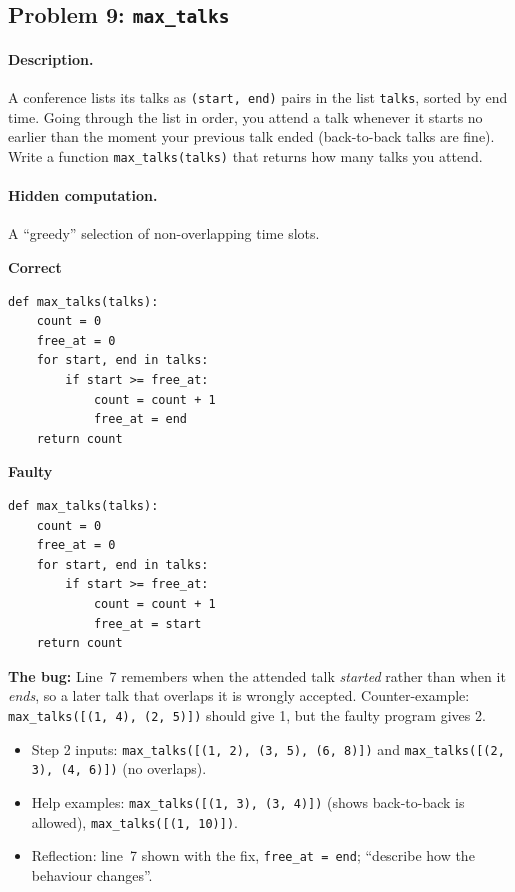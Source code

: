 \documentclass[11pt,a4paper]{article}
\newenvironment{codepair}{\par\noindent}{\par\medskip}
\newcommand{\codelabel}[1]{\textbf{\small #1}\par\vspace{2pt}}
\newcommand{\bugnote}[1]{\par\noindent\textcolor{bugred}{\textbf{The bug:}} #1\par\smallskip}
\begin{document}
\subsection{Problem 9: \texttt{max\_talks}}

\paragraph{Description.} A conference lists its talks as
\texttt{(start, end)} pairs in the list \texttt{talks}, sorted by end
time. Going through the list in order, you attend a talk whenever it
starts no earlier than the moment your previous talk ended (back-to-back
talks are fine). Write a function \texttt{max\_talks(talks)} that returns
how many talks you attend.

\paragraph{Hidden computation.} A ``greedy'' selection of
non-overlapping time slots.

\begin{codepair}
\begin{minipage}[t]{0.48\textwidth}
\codelabel{Correct}
\begin{lstlisting}
def max_talks(talks):
    count = 0
    free_at = 0
    for start, end in talks:
        if start >= free_at:
            count = count + 1
            free_at = end
    return count
\end{lstlisting}
\end{minipage}\hfill
\begin{minipage}[t]{0.48\textwidth}
\codelabel{Faulty}
\begin{lstlisting}
def max_talks(talks):
    count = 0
    free_at = 0
    for start, end in talks:
        if start >= free_at:
            count = count + 1
            free_at = start
    return count
\end{lstlisting}
\end{minipage}
\end{codepair}

\bugnote{Line~7 remembers when the attended talk \emph{started} rather
than when it \emph{ends}, so a later talk that overlaps it is wrongly
accepted. Counter-example: \texttt{max\_talks([(1, 4), (2, 5)])} should
give 1, but the faulty program gives 2.}

\begin{itemize}[nosep]
  \item Step 2 inputs: \texttt{max\_talks([(1, 2), (3, 5), (6, 8)])} and
        \texttt{max\_talks([(2, 3), (4, 6)])} (no overlaps).
  \item Help examples: \texttt{max\_talks([(1, 3), (3, 4)])} (shows
        back-to-back is allowed), \texttt{max\_talks([(1, 10)])}.
  \item Reflection: line~7 shown with the fix, \texttt{free\_at = end};
        ``describe how the behaviour changes''.
\end{itemize}
\end{document}
